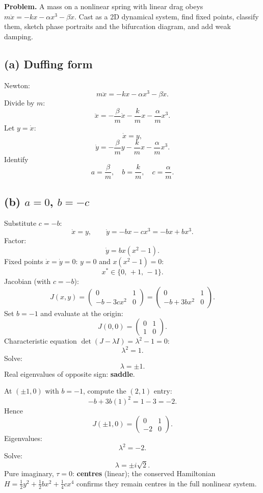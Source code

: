 \documentclass[11pt]{article}
\begin{document}
\textbf{Problem.} A mass on a nonlinear spring with linear drag obeys $m\ddot x = -kx-\alpha x^3 -\beta\dot x$. Cast as a 2D dynamical system, find fixed points, classify them, sketch phase portraits and the bifurcation diagram, and add weak damping.

\subsection*{(a) Duffing form}

Newton:
\[ m\ddot x = -kx - \alpha x^3 - \beta \dot x. \]
Divide by $m$:
\[ \ddot x = -\frac{\beta}{m}\dot x - \frac{k}{m}x - \frac{\alpha}{m}x^3. \]
Let $y=\dot x$:
\[ \dot x = y, \]
\[ \dot y = -\frac{\beta}{m}y - \frac{k}{m}x - \frac{\alpha}{m}x^3. \]
Identify
\[ \boxed{\;a = \frac{\beta}{m},\quad b = \frac{k}{m},\quad c = \frac{\alpha}{m}.\;} \]

\subsection*{(b) $a=0$, $b=-c$}

Substitute $c=-b$:
\[ \dot x = y,\qquad \dot y = -bx - cx^3 = -bx + bx^3. \]
Factor:
\[ \dot y = bx(x^2-1). \]
Fixed points $\dot x=\dot y=0$: $y=0$ and $x(x^2-1)=0$:
\[ x^*\in\{0,\,+1,\,-1\}. \]
Jacobian (with $c=-b$):
\[ J(x,y) = \begin{pmatrix} 0 & 1 \\ -b - 3cx^2 & 0 \end{pmatrix} = \begin{pmatrix} 0 & 1 \\ -b + 3bx^2 & 0 \end{pmatrix}. \]
Set $b=-1$ and evaluate at the origin:
\[ J(0,0) = \begin{pmatrix} 0 & 1 \\ 1 & 0 \end{pmatrix}. \]
Characteristic equation $\det(J-\lambda I)=\lambda^2-1=0$:
\[ \lambda^2 = 1. \]
Solve:
\[ \lambda = \pm 1. \]
Real eigenvalues of opposite sign: \textbf{saddle}.

At $(\pm 1,0)$ with $b=-1$, compute the $(2,1)$ entry:
\[ -b + 3b(1)^2 = 1 - 3 = -2. \]
Hence
\[ J(\pm 1,0) = \begin{pmatrix} 0 & 1 \\ -2 & 0 \end{pmatrix}. \]
Eigenvalues:
\[ \lambda^2 = -2. \]
Solve:
\[ \lambda = \pm i\sqrt{2}. \]
Pure imaginary, $\tau=0$: \textbf{centres} (linear); the conserved Hamiltonian $H = \tfrac12 y^2 + \tfrac12 b x^2 + \tfrac14 c x^4$ confirms they remain centres in the full nonlinear system.
\end{document}
